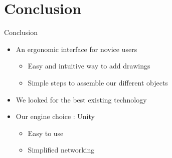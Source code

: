 \documentclass[a4paper,10pt]{beamer}
\begin{document}
		

	
	\section{Conclusion}
	
		\begin{frame}{Conclusion}
			\begin{itemize}
				\item An ergonomic interface for novice users
					\begin{itemize}
						\item Easy and intuitive way to add drawings
						\item Simple steps to assemble our different objects
					\end{itemize}
				\item We looked for the best existing technology
				\item Our engine choice : Unity
					\begin{itemize}
						\item Easy to use
						\item Simplified networking
					\end{itemize}
				
			\end{itemize}
		\end{frame}
		
\end{document}
